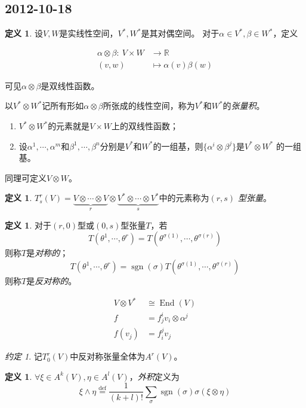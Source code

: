 \documentclass[winfonts,UTF8,c5size,a4paper,fancyhdr,hyperref,titlepage,nocap]{ctexart}
\theoremstyle{definition}
\newtheorem{defn}[thm]{定义}
\theoremstyle{remark}
\newtheorem*{note}{约定}
\numberwithin{equation}{subsection}
\newcommand{\Real}{\mathbb{R}}
\newcommand{\red}{\color{red}}
\newcommand{\defeq}{\stackrel{{\mathrm{def}}}{=}}
\newcommand{\mapdes}[5]
  {
    \begin{align*}
      #1\colon\  #2 & \longrightarrow  #3 \\
            #4 & \mapsto  #5
    \end{align*}
  }
\newcommand{\sgn}{\operatorname{sgn}}
\newcommand{\End}{\operatorname{End}}
\begin{document}
\subsection*{2012-10-18}
\begin{defn}
  设$V,W$是实线性空间，$V^{\ast},W^{\ast}$是其对偶空间。
对于$\alpha\in V^{\ast}, \beta\in W^{\ast}$，定义
\mapdes{\alpha\otimes\beta}{V\times W}{\Real}{(v,w)}{\alpha(v)\beta(w)}
可见$\alpha\otimes\beta$是双线性函数。

以$V^{\ast}\otimes W^{\ast}$记所有形如$\alpha\otimes\beta$所张成的线性空间，称为$V^{\ast}$和$W^{\ast}$的\emph{\red 张量积}。
\begin{enumerate}[1)]
    \setlength{\itemindent}{2ex}
    \item $V^{\ast}\otimes W^{\ast}$的元素就是$V\times W$上的双线性函数；
    \item 设$\alpha^1,\cdots,\alpha^m$和$\beta^1,\cdots,\beta^n$分别是$V^{\ast}$和$W^{\ast}$的一组基，则$\{\alpha^i\otimes\beta^j\}$是$V^{\ast}\otimes W^{\ast}$ 的一组基。
\end{enumerate}
同理可定义$V\otimes W$。
\end{defn}
\begin{defn}
  $T^r_s(V)=\underbrace{V\otimes\cdots\otimes V}_{r}\otimes \underbrace{V^{\ast}\otimes\cdots\otimes V^{\ast}}_{s}$中的元素称为\emph{\red $(r,s)$ 型张量}。
\end{defn}
\begin{defn}
  对于$(r,0)$型或$(0,s)$型张量$T$，若
\begin{equation*}
T(\theta^1,\cdots,\theta^r)=T(\theta^{\sigma(1)},\cdots,\theta^{\sigma(r)})
\end{equation*}
则称$T$是\emph{\red 对称的}；
\begin{equation*}
T(\theta^1,\cdots,\theta^r)=\sgn(\sigma)T(\theta^{\sigma(1)},\cdots,\theta^{\sigma(r)})
\end{equation*}
则称$T$是\emph{\red 反对称的}。
\end{defn}
\begin{align*}
V\otimes V^{\ast}&\cong\End(V)\\
f&=f^i_jv_i\otimes\alpha^j\\
f(v_j)&=f^j_iv_j
\end{align*}
\begin{note}
  记$T^r_0(V)$中反对称张量全体为$A^r(V)$。
\end{note}
\begin{defn}
$\forall \xi\in A^k(V), \eta\in A^l(V)$，\emph{\red 外积}定义为
\begin{equation*}
\xi\wedge\eta\defeq\frac{1}{(k+l)!}\sum_{\sigma}\sgn(\sigma)\sigma(\xi\otimes\eta)
\end{equation*}
\end{defn}
\end{document}
